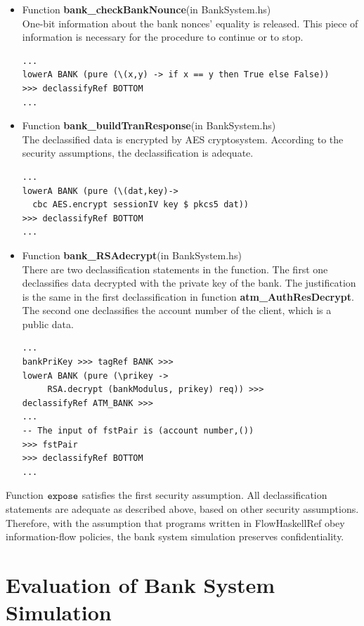 \documentclass{report}
\newcommand{\co}[1]{$\cod{#1}$}
\begin{document}
\begin{itemize}
\item Function \textbf{bank\_checkBankNounce}(in BankSystem.hs) \\
      One-bit information about the bank nonces' equality is released. This piece of information is
      necessary for the procedure to continue or to stop.
\begin{Verbatim}[fontsize=\small]
...
lowerA BANK (pure (\(x,y) -> if x == y then True else False)) 
>>> declassifyRef BOTTOM
...
\end{Verbatim}

\item Function \textbf{bank\_buildTranResponse}(in BankSystem.hs) \\
      The declassified data is encrypted by AES cryptosystem. According to the security assumptions, the 
      declassification is adequate.
\begin{Verbatim}[fontsize=\small]
...
lowerA BANK (pure (\(dat,key)-> 
  cbc AES.encrypt sessionIV key $ pkcs5 dat)) 
>>> declassifyRef BOTTOM
...
\end{Verbatim}

\item Function \textbf{bank\_RSAdecrypt}(in BankSystem.hs) \\
      There are two declassification statements in the function. The first one declassifies data decrypted with the
      private key of the bank. The justification is the same in the first declassification in function
      \textbf{atm\_AuthResDecrypt}. The second one declassifies the account number of the client, which
      is a public data.
\begin{Verbatim}[fontsize=\small]
...
bankPriKey >>> tagRef BANK >>>
lowerA BANK (pure (\prikey -> 
     RSA.decrypt (bankModulus, prikey) req)) >>>
declassifyRef ATM_BANK >>>
...
-- The input of fstPair is (account number,())
>>> fstPair   
>>> declassifyRef BOTTOM
...
\end{Verbatim}

\end{itemize}

Function \co{expose} satisfies the first security assumption. All declassification statements are adequate 
as described above, based on other security assumptions. Therefore,
with the assumption that programs written in FlowHaskellRef obey information-flow policies, 
the bank system simulation preserves confidentiality.

\section{Evaluation of Bank System Simulation}
\end{document}
